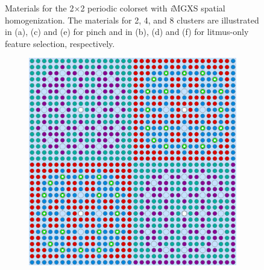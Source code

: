 \begin{figure}[h!]
\begin{subfigure}{0.47\textwidth}
  \caption{}
  \label{fig:chap10-assm-2x2-combined-8}
\end{subfigure}
\caption[Clustered geometries for a 2$\times$2 periodic colorset]{Materials for the 2$\times$2 periodic colorset with \textit{i}\ac{MGXS} spatial homogenization. The materials for 2, 4, and 8 clusters are illustrated in (a), (c) and (e) for pinch and in (b), (d) and (f) for litmus-only feature selection, respectively.}
\label{fig:chap10-2x2-geometries}
\end{figure}

\clearpage

\begin{figure}[h!]
\centering
\begin{subfigure}{0.47\textwidth}
  \centering
  \includegraphics[width=0.9\linewidth]{figures/unsupervised/geometries/with-features/2-clusters/pinch/reflector}
  \caption{}
  \label{fig:chap10-reflector-pinch-2}
\end{subfigure}%
\begin{subfigure}{0.47\textwidth}
  \centering

\end{subfigure}
\end{figure}
